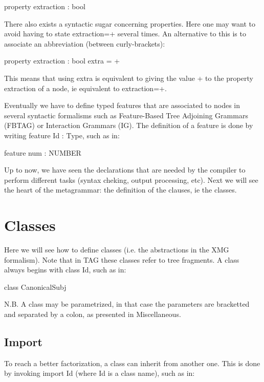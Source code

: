 \documentclass[11pt,fleqn]{book} %
\begin{document}
\begin{theorem}
property extraction : bool
\end{theorem}

There also exists a syntactic sugar concerning properties. Here one may want to avoid having to state extraction=+ several times. An alternative to this is to associate an abbreviation (between curly-brackets):

\begin{theorem}
property extraction : bool {extra = +}
\end{theorem}

This means that using extra is equivalent to giving the value + to the property extraction of a node, ie equivalent to extraction=+.

Eventually we have to define typed features that are associated to nodes in several syntactic formalisms such as Feature-Based Tree Adjoining Grammars (FBTAG) or Interaction Grammars (IG). The definition of a feature is done by writing feature Id : Type, such as in:

\begin{theorem}
feature num : NUMBER
\end{theorem}

Up to now, we have seen the declarations that are needed by the compiler to perform different tasks (syntax cheking, output processing, etc). Next we will see the heart of the metagrammar: the definition of the clauses, ie the classes. 

\section{Classes}
Here we will see how to define classes (i.e. the abstractions in the XMG formalism). Note that in TAG these classes refer to tree fragments. A class always begins with class Id, such as in:

\begin{theorem}
class CanonicalSubj
\end{theorem}
N.B. A class may be parametrized, in that case the parameters are bracketted and separated by a colon, as presented in Miscellaneous.

\subsection{Import}
To reach a better factorization, a class can inherit from another one. This is done by invoking import Id (where Id is a class name), such as in:
\end{document}
